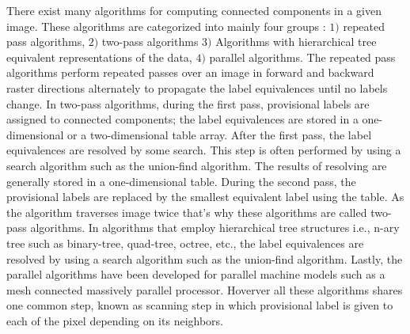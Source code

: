 There exist many algorithms for computing connected components in a given image. These algorithms are categorized into
mainly four groups %
\cite{Suzuki2003_Linear}
: $1)$ repeated pass algorithms, $2)$ two-pass algorithms $3)$ Algorithms with hierarchical tree equivalent representations 
of the data, $4)$ parallel algorithms.
The repeated pass algorithms perform repeated passes over an image in forward and backward raster directions alternately
to propagate the label equivalences until no labels change.
In two-pass algorithms, during the first pass, provisional labels are assigned to connected components;
the label equivalences are stored in a one-dimensional or a two-dimensional table array. After the first pass, the label 
equivalences are resolved by some search. This step is often performed by using
a search algorithm such as the union-find algorithm.
The results of resolving are generally stored in a one-dimensional table. During the second pass, the provisional labels are 
replaced by the smallest equivalent label using the table. As the algorithm traverses image twice that's why these algorithms 
are called two-pass algorithms.
In algorithms that employ hierarchical tree structures i.e., n-ary tree such as binary-tree, quad-tree, octree, etc., the
label equivalences are resolved by using a search algorithm such as the union-find algorithm.
Lastly, the parallel algorithms have been developed for parallel machine models such as a mesh connected massively parallel processor.
Hoverver all these algorithms shares one common step, known as scanning step in which provisional label is given to each of the
pixel depending on its neighbors.

